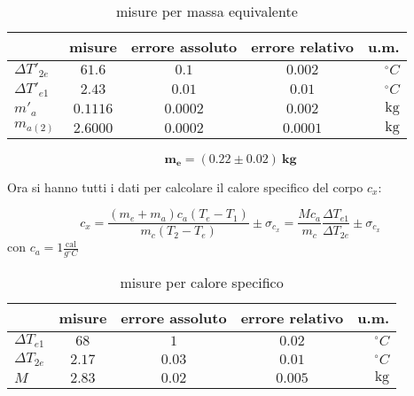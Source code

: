 \documentclass{article}
\begin{document}
	\begin{table}[H] \centering
		\begin{small}
			\begin{tabular}{@{}lcccr@{}}\toprule
				&  	\textbf{misure}	& \textbf{errore assoluto} & \textbf{errore relativo}  & u.m.\\ \midrule
				\(\Delta T'_{2e}\)	&  \(61.6\)	& \(0.1\)	& \(0.002\)	&\(^\circ C\)			\\  \hdashline
				\(\Delta T'_{e1}\)	&  \(2.43\)	& \(0.01\)	& \(0.01\)	&\(^\circ C\)			\\  \hdashline
				\(m'_{a}\)			&  \(0.1116\)	& \(0.0002\)	& \(0.002\)	&\(\SI{}{\kilogram}\) 	 \\  \hdashline
				\(m_{a(2)}\)		    &  \(2.6000\)    & \(0.0002\)	& \(0.0001\)	&\(\SI{}{\kilogram}\) 	\\ \bottomrule
			\end{tabular}
			\caption{misure per massa equivalente}
			\label{table:Tabella massa eqiuivalente 1}
		\end{small}
	\end{table}
	
	
	\[ 
	\boxed{\boldsymbol{m_{e} = (0.22 \pm 0.02)\SI{}{\kilogram}}}
	\]
	
	\noindent
	Ora si hanno tutti i dati per calcolare il calore specifico del corpo \(c_{x}\):
	
	\[ 
	c_{x} = \frac{(m_{e} + m_{a})c_{a}(T_{e} - T_{1})}{m_{c}(T_{2}-T_{e})} \pm \sigma_{c_x} = \frac{Mc_{a}}{m_{c}}\frac{\Delta T_{e1}}{\Delta T_{2e}}\pm \sigma_{c_x} 
	\]
	con \(c_{a} = 1 \frac{\text{cal}}{g ^\circ C}\)
	\begin{table}[H] \centering
		\begin{small}
			\begin{tabular}{@{}lcccr@{}}\toprule
				&  	\textbf{misure}	& \textbf{errore assoluto} & \textbf{errore relativo}  & u.m.\\ \midrule
				\(\Delta T_{e1}\)	&  \(68\)	& \(1\)	& \(0.02\)	&\(^\circ C\)			\\  \hdashline
				\(\Delta T_{2e}\)	&  \(2.17\)	& \(0.03\)	& \(0.01\)	&\(^\circ C\)			\\  \hdashline
				\(M\)		    &  \(2.83\)    & \(0.02\)	& \(0.005\)	&\(\SI{}{\kilogram}\) 	\\  \bottomrule
			\end{tabular}
			\caption{misure per calore specifico}
			\label{table:Tabella calore specifico 1}
		\end{small}
	\end{table}
	
\end{document}
